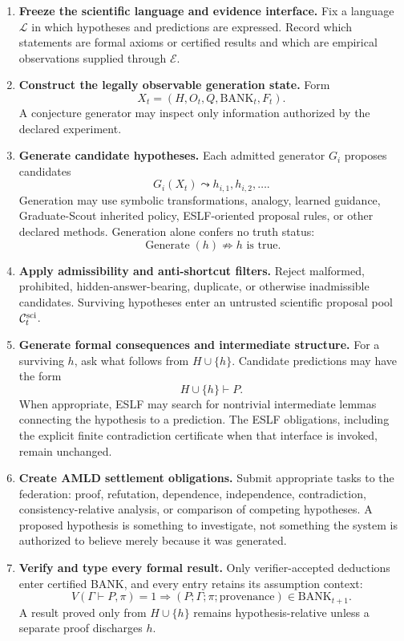 \documentclass[11pt]{article}
\theoremstyle{definition}
\newcommand{\BANK}{\mathrm{BANK}}
\begin{document}
\begin{enumerate}[label=\textbf{Step \arabic*.},leftmargin=*]
\item \textbf{Freeze the scientific language and evidence interface.}
Fix a language $\mathcal L$ in which hypotheses and predictions are expressed. Record which statements are formal axioms or certified results and which are empirical observations supplied through $\mathcal E$.

\item \textbf{Construct the legally observable generation state.}
Form
\[
X_t=(H,O_t,Q,\BANK_t,F_t).
\]
A conjecture generator may inspect only information authorized by the declared experiment.

\item \textbf{Generate candidate hypotheses.}
Each admitted generator $G_i$ proposes candidates
\[
G_i(X_t)\leadsto h_{i,1},h_{i,2},\ldots .
\]
Generation may use symbolic transformations, analogy, learned guidance, Graduate-Scout inherited policy, ESLF-oriented proposal rules, or other declared methods. Generation alone confers no truth status:
\[
\operatorname{Generate}(h)\not\Rightarrow h\text{ is true}.
\]

\item \textbf{Apply admissibility and anti-shortcut filters.}
Reject malformed, prohibited, hidden-answer-bearing, duplicate, or otherwise inadmissible candidates. Surviving hypotheses enter an untrusted scientific proposal pool $\mathcal C_t^{\rm sci}$.

\item \textbf{Generate formal consequences and intermediate structure.}
For a surviving $h$, ask what follows from $H\cup\{h\}$. Candidate predictions may have the form
\[
H\cup\{h\}\vdash P.
\]
When appropriate, ESLF may search for nontrivial intermediate lemmas connecting the hypothesis to a prediction. The ESLF obligations, including the explicit finite contradiction certificate when that interface is invoked, remain unchanged.

\item \textbf{Create AMLD settlement obligations.}
Submit appropriate tasks to the federation: proof, refutation, dependence, independence, contradiction, consistency-relative analysis, or comparison of competing hypotheses. A proposed hypothesis is something to investigate, not something the system is authorized to believe merely because it was generated.

\item \textbf{Verify and type every formal result.}
Only verifier-accepted deductions enter certified BANK, and every entry retains its assumption context:
\[
V(\Gamma\vdash P,\pi)=1
\Longrightarrow
(P;\Gamma;\pi;\text{provenance})\in\BANK_{t+1}.
\]
A result proved only from $H\cup\{h\}$ remains hypothesis-relative unless a separate proof discharges $h$.


\end{enumerate}
\end{document}
